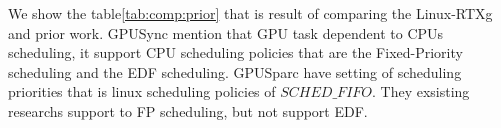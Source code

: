%
%


We show the table\ref{tab:comp:prior} that is result of comparing the Linux-RTXg and prior work.
GPUSync mention that GPU task dependent to CPUs scheduling, it support CPU scheduling policies that are the Fixed-Priority scheduling and the EDF scheduling.
GPUSparc have setting of scheduling priorities that is linux scheduling policies of $SCHED\_FIFO$.
They exsisting researchs support to FP scheduling, but not support EDF.

